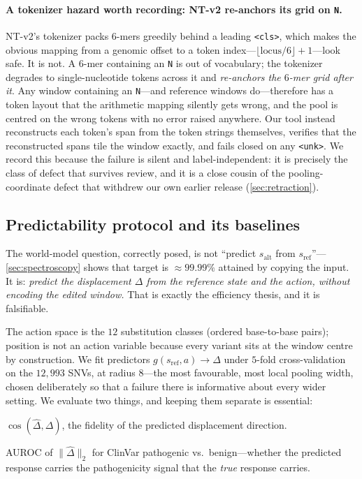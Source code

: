 \documentclass{article}
\newcommand{\sref}{s_{\mathrm{ref}}}
\newcommand{\salt}{s_{\mathrm{alt}}}
\newcommand{\D}{\Delta}
\newcommand{\Dhat}{\hat\Delta}
\newcommand{\gpred}{g}
\begin{document}
\paragraph{A tokenizer hazard worth recording: NT-v2 re-anchors its grid on \texttt{N}.} NT-v2's
tokenizer packs $6$-mers greedily behind a leading \texttt{<cls>}, which makes the obvious mapping
from a genomic offset to a token index---$\lfloor \text{locus}/6\rfloor + 1$---look safe. It is not.
A $6$-mer containing an \texttt{N} is out of vocabulary; the tokenizer degrades to single-nucleotide
tokens across it and \emph{re-anchors the $6$-mer grid after it}. Any window containing an
\texttt{N}---and reference windows do---therefore has a token layout that the arithmetic mapping
silently gets wrong, and the pool is centred on the wrong tokens with no error raised anywhere. Our
tool instead reconstructs each token's span from the token strings themselves, verifies that the
reconstructed spans tile the window exactly, and fails closed on any \texttt{<unk>}. We record this
because the failure is silent and label-independent: it is precisely the class of defect that
survives review, and it is a close cousin of the pooling-coordinate defect that withdrew our own
earlier release (\cref{sec:retraction}).

\subsection{Predictability protocol and its baselines}
\label{sec:predict-protocol}
The world-model question, correctly posed, is not ``predict $\salt$ from $\sref$''---%
\cref{sec:spectroscopy} shows that target is $\approx99.99\%$ attained by copying the input. It is:
\emph{predict the displacement $\D$ from the reference state and the action, without encoding the
edited window.} That is exactly the efficiency thesis, and it is falsifiable.

The action space is the $12$ substitution classes (ordered base-to-base pairs); position is not an
action variable because every variant sits at the window centre by construction. We fit predictors
$\gpred(\sref,a)\to\Dhat$ under $5$-fold cross-validation on the $12{,}993$ SNVs, at radius
$8$---the most favourable, most local pooling width, chosen deliberately so that a failure there is
informative about every wider setting. We evaluate two things, and keeping them separate is
essential:
\begin{description}[leftmargin=1.2em,itemsep=1pt,topsep=2pt]
\item[Direction:] $\cos(\Dhat,\D)$, the fidelity of the predicted displacement direction.
\item[Magnitude:] AUROC of $\lVert\Dhat\rVert_2$ for ClinVar pathogenic vs.\ benign---whether the
predicted response carries the pathogenicity signal that the \emph{true} response carries.
\end{description}
\end{document}
